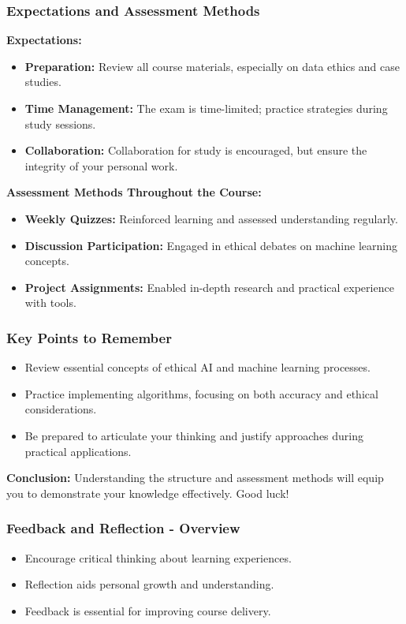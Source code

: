 \documentclass[aspectratio=169]{beamer}
\begin{document}
\begin{frame}[fragile]
    \frametitle{Expectations and Assessment Methods}
    \textbf{Expectations:}
    \begin{itemize}
        \item \textbf{Preparation:} Review all course materials, especially on data ethics and case studies.
        \item \textbf{Time Management:} The exam is time-limited; practice strategies during study sessions.
        \item \textbf{Collaboration:} Collaboration for study is encouraged, but ensure the integrity of your personal work.
    \end{itemize}

    \textbf{Assessment Methods Throughout the Course:}
    \begin{itemize}
        \item \textbf{Weekly Quizzes:} Reinforced learning and assessed understanding regularly.
        \item \textbf{Discussion Participation:} Engaged in ethical debates on machine learning concepts.
        \item \textbf{Project Assignments:} Enabled in-depth research and practical experience with tools.
    \end{itemize}
\end{frame}

\begin{frame}[fragile]
    \frametitle{Key Points to Remember}
    \begin{itemize}
        \item Review essential concepts of ethical AI and machine learning processes.
        \item Practice implementing algorithms, focusing on both accuracy and ethical considerations.
        \item Be prepared to articulate your thinking and justify approaches during practical applications.
    \end{itemize}
    \textbf{Conclusion:} Understanding the structure and assessment methods will equip you to demonstrate your knowledge effectively. Good luck!
\end{frame}

\begin{frame}[fragile]
    \frametitle{Feedback and Reflection - Overview}
    \begin{itemize}
        \item Encourage critical thinking about learning experiences.
        \item Reflection aids personal growth and understanding.
        \item Feedback is essential for improving course delivery.
    \end{itemize}
\end{frame}
\end{document}
